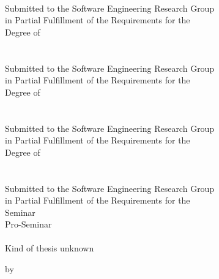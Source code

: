 \begin{titlepage}
\begin{center}
    
  \ifthenelse{\equal{\ausarbeitungsTyp}{\ausarbeitungsTypMaster}}
	{
		{\Large \masterArbeit }\\[6pt]
		Submitted to the Software Engineering Research Group\\
		in Partial Fulfillment of the Requirements for the\\
		Degree of\\[6pt]
  	{\Large \gradMaster}\\[30pt]
	}
	{
	 	\ifthenelse{\equal{\ausarbeitungsTyp}{\ausarbeitungsTypDiplom}}
		{
			{\Large \diplomArbeit }\\[6pt]
	  	Submitted to the Software Engineering Research Group\\
		  in Partial Fulfillment of the Requirements for the\\
		  Degree of\\[6pt]
	  	{\Large \gradDiplom}\\[30pt]
		}
		{
		 	\ifthenelse{\equal{\ausarbeitungsTyp}{\ausarbeitungsTypBachelor}}
			{
				{\Large \bachelorArbeit }\\[6pt]
		  	Submitted to the Software Engineering Research Group\\
		    in Partial Fulfillment of the Requirements for the\\
		    Degree of\\[6pt]
		  	{\Large \gradBachelor}\\[30pt]
			}
			{
			 	\ifthenelse{\equal{\ausarbeitungsTyp}{\ausarbeitungsTypSeminar}
			 							\OR
			 							\equal{\ausarbeitungsTyp}{\ausarbeitungsTypProSeminar}
			 						 }
				{
					{\Large \seminarArbeit }\\[6pt]
			  	Submitted to the Software Engineering Research Group\\
			  	in Partial Fulfillment of the Requirements for the\\
			  	\ifthenelse{\equal{\ausarbeitungsTyp}{\ausarbeitungsTypSeminar}}
			  	{
			  		Seminar\\[6pt]
			  	}
			  	{
			  		Pro-Seminar\\[6pt]
			  	}
			  	{\Large \titelDesSeminars}\\[10pt]
				}
				{
				 	{\Large Kind of thesis unknown }\\[42pt]
				}
			}
		}
	}  
  
  
  by\\
  {\scshape\large \meinName}\\
  \meineStrasseHausNr\\\meinePLZundOrt\\[30pt]
  

\end{center}
\end{titlepage}
